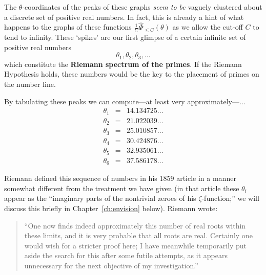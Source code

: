 \documentclass[openany]{book}
\newcommand{\ill}[3]{%
   \begin{figure}[H]%
   \vspace{-2ex}
   \centering%
   \texttt{[image: illustrations/\#1]}%
   \caption{#3}%
   \vspace{-2ex}
    \end{figure}}
\theoremstyle{plain}
\theoremstyle{definition}
\begin{document}
{{   %





 The
$\theta$-coordinates of the peaks of these graphs {\it seem to be}
vaguely clustered about a discrete set of positive real numbers. In
fact, this is already a hint of what happens to the graphs of these
functions ${\frac{1}{C}}{\hat\Phi}_{\le C}(\theta)$ as we allow the cut-off $C$ to
tend to infinity.  These `spikes' are our first glimpse of a
certain infinite set of positive real numbers
 $$\theta_1,\theta_2,\theta_3,\dots$$ which constitute the {\bf Riemann spectrum of
  the primes}. If the Riemann Hypothesis holds, these numbers would
be the key to the placement of primes on the number line.








By tabulating these peaks we can compute---at least very approximately---$\dots$
\begin{eqnarray*}
\theta_1 &=& 14.134725 \dots\\
\theta_2 &=& 21.022039 \dots\\
\theta_3 &=& 25.010857 \dots\\
\theta_4 &=& 30.424876 \dots\\
\theta_5 &=& 32.935061 \dots\\
\theta_6 &=& 37.586178 \dots
\end{eqnarray*}

Riemann defined this sequence of numbers in his 1859 article in a
manner somewhat different from the treatment we have given (in that
article these $\theta_i$ appear as the ``imaginary parts of the
nontrivial zeroes of his $\zeta$-function;'' we will discuss this
briefly in Chapter~\ref{ch:envision} below). Riemann wrote:
 \begin{quote}
  ``One now finds indeed approximately this number of real roots
  within these limits, and it is very probable that all roots are
  real. Certainly one would wish for a stricter proof here; I have
  meanwhile temporarily put aside the search for this after some
  futile attempts, as it appears unnecessary for the next objective of
  my investigation.''
\end{quote}

}}
\end{document}
